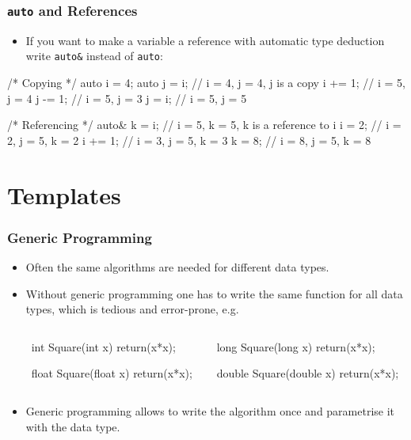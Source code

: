 \documentclass[aspectratio=169,ignorenonframetext,11pt]{beamer}
\def\inline{\lstinline[basicstyle=\small\ttfamily]}
\begin{document}
\begin{frame}[fragile]
  \frametitle<presentation>{\texttt{auto} and References}
  \begin{itemize}
  \item If you want to make a variable a reference with automatic type deduction write \inline!auto&! instead of \inline!auto!:
  \end{itemize}

  \begin{cppcode}
/* Copying */
auto i = 4;
auto j = i;  // i = 4, j = 4, j is a copy
i += 1;      // i = 5, j = 4
j -= 1;      // i = 5, j = 3
j  = i;      // i = 5, j = 5

/* Referencing */
auto& k = i; // i = 5, k = 5, k is a reference to i
i  = 2;      // i = 2, j = 5, k = 2
i += 1;      // i = 3, j = 5, k = 3
k  = 8;      // i = 8, j = 5, k = 8
  \end{cppcode}
\end{frame}


\section{Templates}


\begin{frame}[fragile]
\frametitle<presentation>{Generic Programming}


\begin{itemize}%
\item Often the same algorithms are needed for different data types.
\item Without generic programming one has to write the same function for all data types, which is tedious and error-prone, e.g.
\end{itemize}
\begin{columns}
  \begin{column}{0.\linewidth}
  \end{column}
  \begin{column}{0.4\linewidth}
\begin{cppcode}
int Square(int x) {
  return(x*x);
}

float Square(float x) {
  return(x*x);
}
\end{cppcode}
  \end{column}
  \begin{column}{0.4\linewidth}
\begin{cppcode}
long Square(long x) {
  return(x*x);
}

double Square(double x) {
  return(x*x);
}      
\end{cppcode}
  \end{column}
\end{columns}
\begin{itemize}
\item Generic programming allows to write the algorithm once and parametrise it with the
data type.
\end{itemize}

\end{frame}
\end{document}
